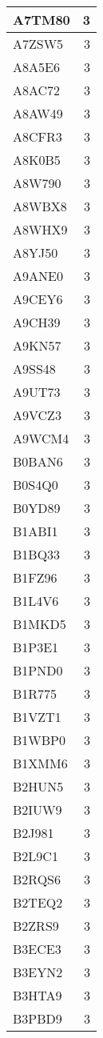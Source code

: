 \documentclass[
]{book}
\theoremstyle{definition}
\theoremstyle{definition}
\theoremstyle{definition}
\theoremstyle{definition}
\theoremstyle{remark}
\begin{document}
\begin{table}
\begin{tabular}{l|r}
\hline
A7TM80 & 3\\
\hline
A7ZSW5 & 3\\
\hline
A8A5E6 & 3\\
\hline
A8AC72 & 3\\
\hline
A8AW49 & 3\\
\hline
A8CFR3 & 3\\
\hline
A8K0B5 & 3\\
\hline
A8W790 & 3\\
\hline
A8WBX8 & 3\\
\hline
A8WHX9 & 3\\
\hline
A8YJ50 & 3\\
\hline
A9ANE0 & 3\\
\hline
A9CEY6 & 3\\
\hline
A9CH39 & 3\\
\hline
A9KN57 & 3\\
\hline
A9SS48 & 3\\
\hline
A9UT73 & 3\\
\hline
A9VCZ3 & 3\\
\hline
A9WCM4 & 3\\
\hline
B0BAN6 & 3\\
\hline
B0S4Q0 & 3\\
\hline
B0YD89 & 3\\
\hline
B1ABI1 & 3\\
\hline
B1BQ33 & 3\\
\hline
B1FZ96 & 3\\
\hline
B1L4V6 & 3\\
\hline
B1MKD5 & 3\\
\hline
B1P3E1 & 3\\
\hline
B1PND0 & 3\\
\hline
B1R775 & 3\\
\hline
B1VZT1 & 3\\
\hline
B1WBP0 & 3\\
\hline
B1XMM6 & 3\\
\hline
B2HUN5 & 3\\
\hline
B2IUW9 & 3\\
\hline
B2J981 & 3\\
\hline
B2L9C1 & 3\\
\hline
B2RQS6 & 3\\
\hline
B2TEQ2 & 3\\
\hline
B2ZRS9 & 3\\
\hline
B3ECE3 & 3\\
\hline
B3EYN2 & 3\\
\hline
B3HTA9 & 3\\
\hline
B3PBD9 & 3\\

\end{tabular}
\end{table}
\end{document}
